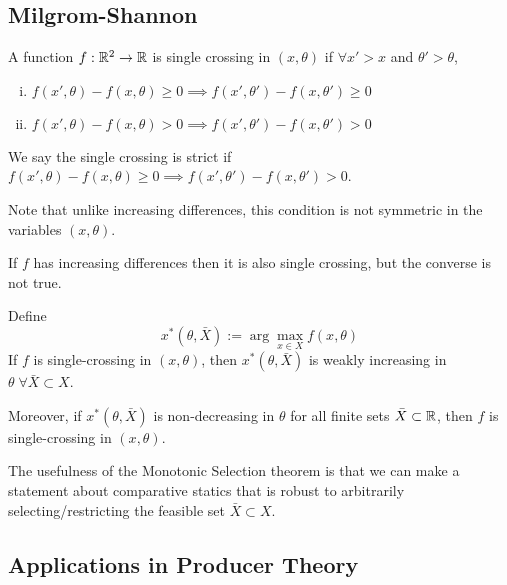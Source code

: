 \subsection{Milgrom-Shannon}
\label{sec:milgrom-shannon}

\begin{definition}
  A function $f: {\mathbb R}^2 \to {\mathbb R}$ is single crossing in $(x, \theta)$ if
  $\forall x' > x$ and $\theta' > \theta$,
  \begin{enumerate}[(i)]
  \item $f(x', \theta) - f(x, \theta) \geq 0 \implies f(x', \theta') -
    f(x, \theta') \geq 0$
  \item $f(x', \theta) - f(x, \theta) > 0 \implies f(x', \theta') -
    f(x, \theta') > 0$
  \end{enumerate}

  We say the single crossing is strict if $f(x', \theta) - f(x,
  \theta) \geq 0 \implies f(x', \theta') - f(x, \theta') > 0$.
\end{definition}

Note that unlike increasing differences, this condition is not
symmetric in the variables $(x, \theta)$.

\begin{prop}
  If $f$ has increasing differences then it is also single crossing,
  but the converse is not true.
\end{prop}

\begin{prop}
  Define
  \[
  x^*(\theta, \bar X) := \arg \max_{x \in X} f(x, \theta)
  \]
  If $f$ is single-crossing in $(x, \theta)$, then $x^*(\theta, \bar
  X)$ is weakly increasing in $\theta \; \forall \bar X \subset X$.

  Moreover, if $x^*(\theta, \bar X)$ is non-decreasing in $\theta$ for
  all finite sets $\bar X \subset {\mathbb R}$, then $f$ is single-crossing in
  $(x, \theta)$.
\end{prop}

The usefulness of the Monotonic Selection theorem is that we can make
a statement about comparative statics that is robust to arbitrarily
selecting/restricting the feasible set $\bar X \subset X$.

\subsection{Applications in Producer Theory}
\label{sec:appl-prod-theory}

